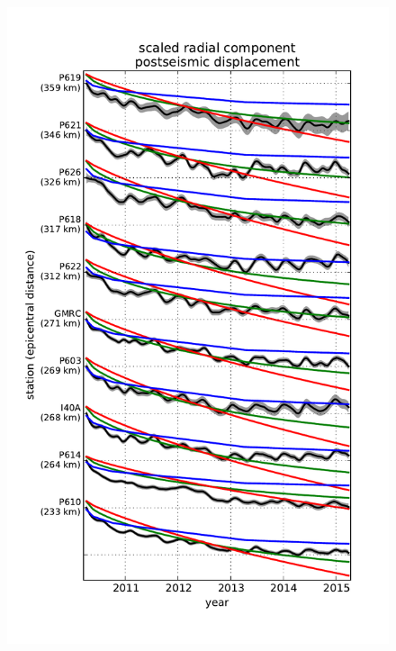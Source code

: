 \documentclass[12pt]{article}
\begin{document}
\begin{figure}
\includegraphics[scale=0.9]{Figures/far_field_final_record_section}
\centering 
\caption{}
\label{fig:FinalFarFieldRS}
\end{figure} 
\end{document}
